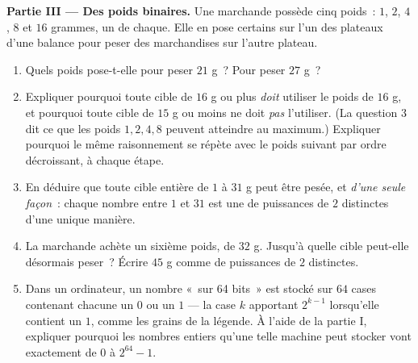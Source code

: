 \begin{problem}[{Devoir maison --- la \omterm{def:g1:addition:def}{somme} géométrique
$1 + 2 + 4 + \dots + 2^{n-1} = 2^n - 1$, d'une légende célèbre
jusqu'aux nombres binaires}]
\medskip
\noindent\textbf{Partie III --- Des poids binaires.}
Une marchande possède cinq poids~: $1$, $2$, $4$, $8$ et $16$
grammes, un de chaque. Elle en pose certains sur l'un des plateaux
d'une balance pour peser des marchandises sur l'autre plateau.
\begin{enumerate}[resume]
  \item Quels poids pose-t-elle pour peser $21$ g~? Pour peser
        $27$ g~?
  \item Expliquer pourquoi toute cible de $16$ g ou plus \emph{doit}
        utiliser le poids de $16$ g, et pourquoi toute cible de
        $15$ g ou moins ne doit \emph{pas} l'utiliser. (La question
        3 dit ce que les poids $1, 2, 4, 8$ peuvent atteindre au
        maximum.) Expliquer pourquoi le même raisonnement se répète
        avec le poids suivant par ordre décroissant, à chaque étape.
  \item En déduire que toute cible entière de $1$ à $31$ g peut être
        pesée, et \emph{d'une seule façon}~: chaque nombre entre $1$
        et $31$ est une  de puissances de $2$ distinctes d'une
        unique manière.
  \item La marchande achète un sixième poids, de $32$ g. Jusqu'à
        quelle cible peut-elle désormais peser~? Écrire $45$ g comme
         de puissances de $2$ distinctes.
  \item Dans un ordinateur, un nombre «~sur 64 bits~» est stocké sur
        $64$ cases contenant chacune un $0$ ou un $1$ --- la case
        $k$ apportant $2^{k-1}$ lorsqu'elle contient un $1$, comme
        les grains de la légende. À l'aide de la partie I, expliquer
        pourquoi les nombres entiers qu'une telle machine peut
        stocker vont exactement de $0$ à $2^{64} - 1$.
\end{enumerate}
\end{problem}
